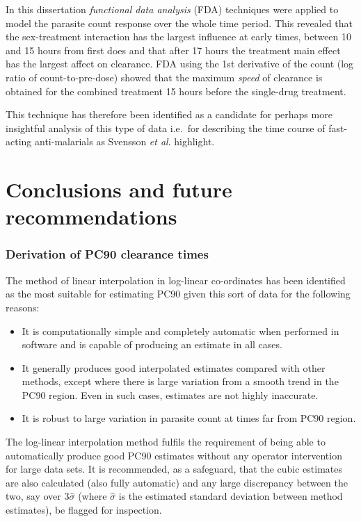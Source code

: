 In this dissertation \emph{functional data analysis} (FDA) techniques were applied to model the parasite count response over the whole time period. This revealed that the sex-treatment interaction has the largest influence at early times, between 10 and 15 hours from first does and that after 17 hours the treatment main effect has the largest affect on clearance. FDA using the 1st derivative of the count (log ratio of count-to-pre-dose) showed that the maximum \emph{speed} of clearance is obtained for the combined treatment 15 hours before the single-drug treatment.

This technique has therefore been identified as a candidate for perhaps more insightful analysis of this type of data i.e.\ for describing the time course of fast-acting anti-malarials as Svensson {\it et al}. highlight.

\section{Conclusions and future recommendations}

\subsubsection*{Derivation of PC90 clearance times}
The method of linear interpolation in log-linear co-ordinates has been identified as the most suitable for estimating PC90 given this sort of data for the following reasons:
\begin{itemize}
\item It is computationally simple and completely automatic when performed in software and is capable of producing an estimate in all cases.
\item It generally produces good interpolated estimates compared with other methods, except where there is large variation from a smooth trend in the PC90 region. Even in such cases, estimates are not highly inaccurate.
\item It is robust to large variation in parasite count at times far from PC90 region.
\end{itemize}
The log-linear interpolation method fulfils the requirement of being able to automatically produce good PC90 estimates without any operator intervention for large data sets. It is recommended, as a safeguard, that the cubic estimates are also calculated (also fully automatic) and any large discrepancy between the two, say over 3$\hat{\sigma}$ (where $\hat{\sigma}$ is the estimated standard deviation between method estimates), be flagged for inspection.
